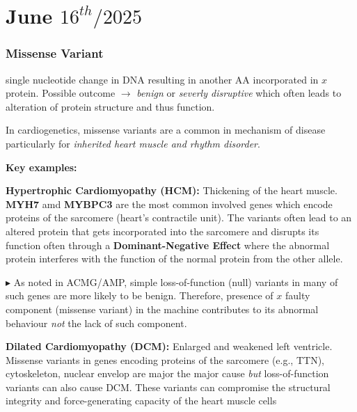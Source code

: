 \documentclass[../main.tex]{subfiles}
\begin{document}
\chapter{June $16^{th} / 2025$}
\label{ch:tufte-design}


\subsection*{Missense Variant} 

single nucleotide change in DNA resulting in another AA incorporated in $x$ protein. Possible outcome  $\rightarrow$ \textit{benign} or \textit{severly disruptive} which often leads to alteration of protein structure and thus function.

In cardiogenetics, missense variants are a common in mechanism of disease particularly for \textit{inherited heart muscle and rhythm disorder}.

\vspace{0.2cm}

\textbf{Key examples:} 

\vspace{0.2cm}

\textbf{Hypertrophic Cardiomyopathy (HCM):} Thickening of the heart muscle. \textbf{MYH7} amd \textbf{MYBPC3} are the most common involved genes which encode proteins of the sarcomere (heart's contractile unit). The variants often lead to an altered protein that gets incorporated into the sarcomere and disrupts its function often through a \textbf{Dominant-Negative Effect} where the abnormal protein interferes with the function of the normal protein from the other allele.

$\blacktriangleright$ As noted in ACMG/AMP, simple loss-of-function (null) variants in many of such genes are more likely to be benign. Therefore, presence of $x$ faulty component (missense variant) in the machine contributes to its abnormal behaviour \textit{not} the lack of such component. 

\vspace{0.3cm}

\textbf{Dilated Cardiomyopathy (DCM):} Enlarged and weakened left ventricle. Missense variants in genes encoding proteins of the sarcomere (e.g., TTN), cytoskeleton, nuclear envelop are major the major cause \textit{but} loss-of-function variants can also cause DCM. These variants can compromise the structural integrity and force-generating capacity of the heart muscle cells
\end{document}
